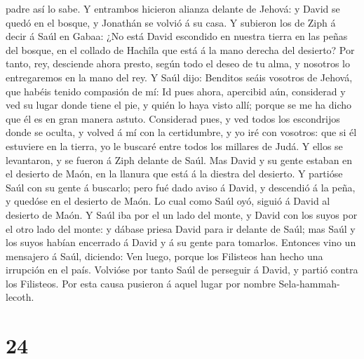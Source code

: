 padre así lo sabe.  Y entrambos hicieron alianza delante
de Jehová: y David se quedó en el bosque, y Jonathán se volvió á su
casa.  Y subieron los de Ziph á decir á Saúl en Gabaa:
¿No está David escondido en nuestra tierra en las peñas del bosque, en
el collado de Hachîla que está á la mano derecha del desierto?
 Por tanto, rey, desciende ahora presto, según todo el
deseo de tu alma, y nosotros lo entregaremos en la mano del rey.
 Y Saúl dijo: Benditos seáis vosotros de Jehová, que
habéis tenido compasión de mí:  Id pues ahora, apercibid
aún, considerad y ved su lugar donde tiene el pie, y quién lo haya visto
allí; porque se me ha dicho que él es en gran manera astuto.
 Considerad pues, y ved todos los escondrijos donde se
oculta, y volved á mí con la certidumbre, y yo iré con vosotros: que si
él estuviere en la tierra, yo le buscaré entre todos los millares de
Judá.  Y ellos se levantaron, y se fueron á Ziph delante
de Saúl. Mas David y su gente estaban en el desierto de Maón, en la
llanura que está á la diestra del desierto.  Y partióse
Saúl con su gente á buscarlo; pero fué dado aviso á David, y descendió á
la peña, y quedóse en el desierto de Maón. Lo cual como Saúl oyó, siguió
á David al desierto de Maón.  Y Saúl iba por el un lado
del monte, y David con los suyos por el otro lado del monte: y dábase
priesa David para ir delante de Saúl; mas Saúl y los suyos habían
encerrado á David y á su gente para tomarlos.  Entonces
vino un mensajero á Saúl, diciendo: Ven luego, porque los Filisteos han
hecho una irrupción en el país.  Volvióse por tanto Saúl
de perseguir á David, y partió contra los Filisteos. Por esta causa
pusieron á aquel lugar por nombre Sela-hammah-lecoth. 

\hypertarget{section-23}{%
\section{24}\label{section-23}}

